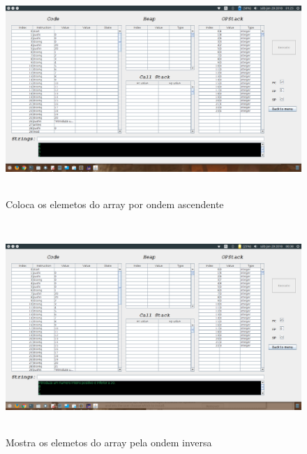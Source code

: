 \documentclass{report}
\begin{document}
\begin{figure}[h]
	\centering
	\includegraphics[width=14cm,height= 8cm]{Exemplo5-1.png}
	\caption{Coloca os elemetos do array por ondem ascendente}
	\label{Exemplo 5.1}
\end{figure}

\begin{figure}[h]
	\centering
	\includegraphics[width=14cm,height= 8cm]{exemplo6-1.png}
	\caption{Mostra os elemetos do array pela ondem inversa}
	\label{Exemplo 6.1}
\end{figure}
\end{document}
